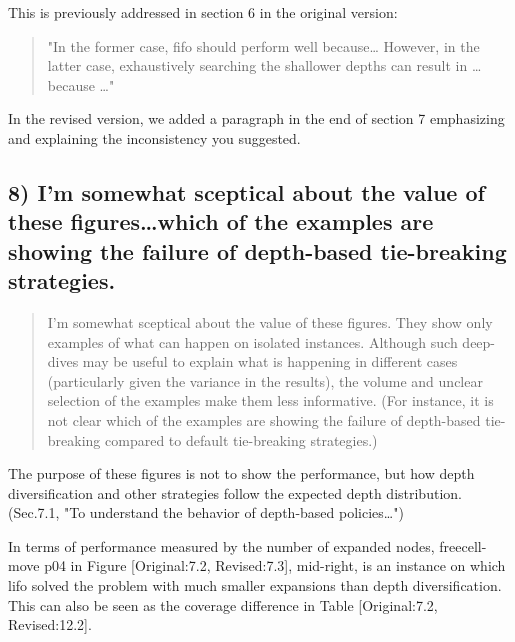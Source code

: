 \documentclass{article}
\begin{document}
This is previously addressed in section 6 in the original version:

\begin{quote}
"In the former case, fifo should perform well because\ldots{} However, in the latter case, exhaustively
searching the shallower depths can result in \ldots{} because \ldots{}"
\end{quote}

In the revised version,
we added a paragraph in the end of section 7
emphasizing and explaining the inconsistency you suggested.

\subsection{8) I'm somewhat sceptical about the value of these figures\ldots{}which of the examples are showing the failure of depth-based tie-breaking strategies.}
\label{sec:orgheadline33}

\begin{quote}
 I'm somewhat sceptical about the value of these figures. They show
only examples of what can happen on isolated instances. Although such
deep-dives may be useful to explain what is happening in different
cases (particularly given the variance in the results), the volume and
unclear selection of the examples make them less informative. (For
instance, it is not clear which of the examples are showing the
failure of depth-based tie-breaking compared to default tie-breaking
strategies.)
\end{quote}

The purpose of these figures is not to show the performance,
but how depth diversification and other strategies follow the expected depth distribution.
(Sec.7.1, "To understand the behavior of depth-based policies\ldots{}")

In terms of performance measured by the number of expanded nodes,
freecell-move p04 in Figure [Original:7.2, Revised:7.3], mid-right,
is an instance on which lifo solved the problem
with much smaller expansions than depth diversification.
This can also be seen as the coverage difference in Table [Original:7.2, Revised:12.2].
\end{document}
